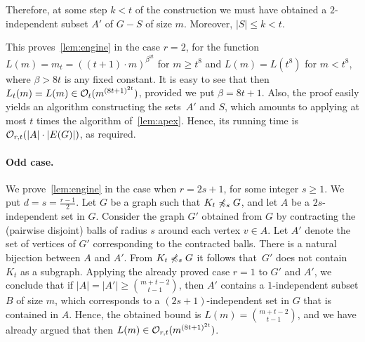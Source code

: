  Therefore, at some step $k<t$ of the construction we must have obtained a $2$-independent subset $A'$ of $G-S$ of size $m$. Moreover, $|S|\le k<t$.
 
 
 
 This proves~\cref{lem:engine} in the case $r=2$, for the function $L(m)=m_t=((t+1)\cdot m)^{\beta^{2t}}$
 for $m\ge t^8$ and $L(m)=L(t^8)$ for $m<t^8$, where $\beta>8t$ is any fixed constant.
 It is easy to see that then $L_t(m)=L(m)\in \mathcal{O}_{t}{(m^{{(8t+1)}^{2t}})}$, provided we put $\beta=8t+1$.
 Also, the proof easily yields an algorithm constructing the sets~$A'$ and $S$,
 which amounts to applying at most $t$ times the algorithm of~\cref{lem:apex}.
 Hence, its running time  is $\mathcal{O}_{r,t}(|A|\cdot |E(G)|)$, as required.


\paragraph{Odd case.}
We prove~\cref{lem:engine} in the case when $r=2s+1$, for some integer $s\geq 1$. We put $d=s=\frac{r-1}{2}$.
Let $G$ be a graph such that $K_t\not\preccurlyeq_s G$, and 
 let $A$ be a $2s$-independent set in $G$. Consider the graph $G'$ obtained from $G$
by contracting the (pairwise disjoint) balls of radius $s$ around each vertex $v\in A$.
 Let $A'$ denote the set of vertices of $G'$ corresponding to the contracted balls. There is a natural bijection between $A$ and $A'$.
From $K_t\not\preccurlyeq_s G$ it follows that~$G'$ does not contain $K_t$ as a subgraph. Applying the already proved case $r=1$ to $G'$ and $A'$, we conclude that 
if $|A|=|A'|\ge {m+t-2\choose t-1}$, then
 $A'$ contains a $1$-independent subset $B$ of size $m$,
 which corresponds to a $(2s+1)$-independent set in $G$ that is contained in $A$.
 Hence, the obtained bound is $L(m)={m+t-2\choose t-1}$, and we have already argued that then $L(m)\in \mathcal{O}_{r,t}{(m^{{(8t+1)}^{2t}})}$.
 
 
